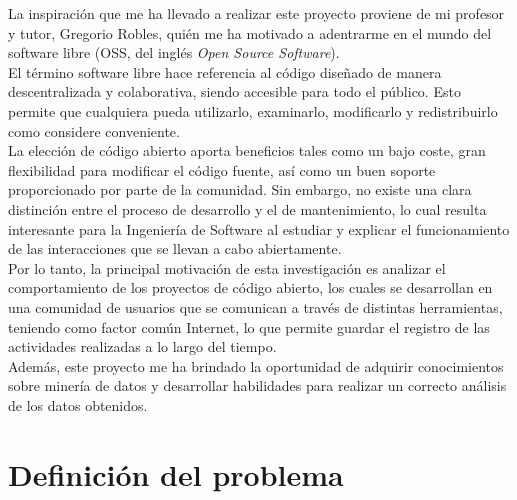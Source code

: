 \documentclass[a4paper, 12pt]{book}
\begin{document}
La inspiración que me ha llevado a realizar este proyecto proviene de mi profesor y tutor, Gregorio Robles, quién me ha
motivado a adentrarme en el mundo del software libre (OSS, del inglés \textit{Open Source Software}).
\\El término software libre hace referencia al código diseñado de manera descentralizada y colaborativa, siendo
accesible para todo el público. Esto permite que cualquiera pueda utilizarlo, examinarlo, modificarlo y
redistribuirlo como considere conveniente.
\\La elección de código abierto aporta beneficios tales como un bajo coste, gran flexibilidad para
modificar el código fuente, así como un buen soporte proporcionado por parte de la comunidad.
Sin embargo, no existe una clara distinción entre el proceso de desarrollo y el de mantenimiento, lo cual resulta interesante
para la Ingeniería de Software al estudiar y explicar el funcionamiento de las interacciones que se llevan a cabo abiertamente.
\\Por lo tanto, la principal motivación de esta investigación es analizar el comportamiento de los proyectos de código abierto, los cuales se
desarrollan en una comunidad de usuarios que se comunican a través de distintas herramientas, teniendo como factor común Internet, lo que
permite guardar el registro de las actividades realizadas a lo largo del tiempo.
\\Además, este proyecto me ha brindado la oportunidad de adquirir conocimientos sobre minería de datos y desarrollar
habilidades para realizar un correcto análisis de los datos obtenidos.

\section{Definición del problema}
\label{sec:definición del problema}
\end{document}
